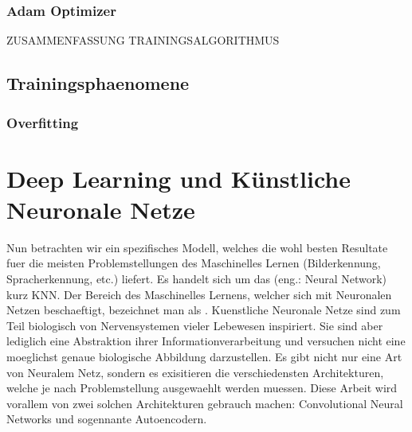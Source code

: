 \subsection{Adam Optimizer}
ZUSAMMENFASSUNG TRAININGSALGORITHMUS

\section{Trainingsphaenomene}

\subsection{Overfitting}


\chapter{Deep Learning und Künstliche Neuronale Netze}
Nun betrachten wir ein spezifisches Modell, welches die wohl besten Resultate
fuer die meisten Problemstellungen des Maschinelles Lernen (Bilderkennung,
Spracherkennung, etc.) liefert. Es handelt sich um das  (eng.: Neural Network) kurz KNN.
Der Bereich des Maschinelles Lernens, welcher sich mit Neuronalen Netzen
beschaeftigt, bezeichnet man als .
\para{}
Kuenstliche Neuronale Netze sind zum Teil biologisch von Nervensystemen vieler
Lebewesen inspiriert.
Sie sind aber lediglich eine Abstraktion ihrer Informationverarbeitung und versuchen nicht eine moeglichst genaue biologische Abbildung darzustellen.
Es gibt nicht nur eine Art von Neuralem Netz, sondern es exisitieren die
verschiedensten Architekturen, welche je nach Problemstellung ausgewaehlt werden
muessen. Diese Arbeit wird vorallem von zwei solchen Architekturen gebrauch machen:
Convolutional Neural Networks und sogennante Autoencodern.

